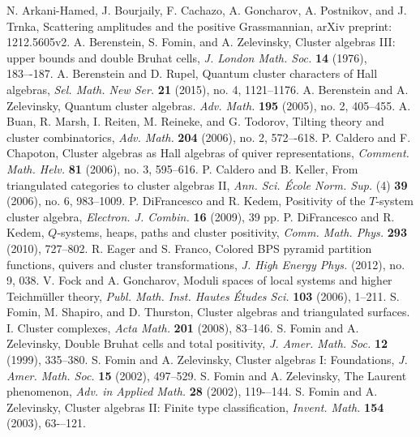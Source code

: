 \documentclass{amsart}
\theoremstyle{definition}
\theoremstyle{remark}
\numberwithin{equation}{section}
\begin{document}
\begin{thebibliography}{99}
  	 N. Arkani-Hamed, J. Bourjaily, F. Cachazo, A. Goncharov, A. Postnikov, and J. Trnka, Scattering amplitudes and the positive Grassmannian, arXiv preprint: 1212.5605v2.
  	 A. Berenstein, S. Fomin, and A. Zelevinsky, Cluster algebras III: upper bounds and double Bruhat cells, \textsl{J. London Math. Soc.} \textbf{14} (1976), 183–-187.
  	 A. Berenstein and D. Rupel, Quantum cluster characters of Hall algebras, \textsl{Sel. Math. New Ser.} \textbf{21} (2015), no. 4, 1121--1176.
  	 A. Berenstein and A. Zelevinsky, Quantum cluster algebras. \textsl{Adv. Math.} \textbf{195} (2005), no. 2, 405--455.
	 A. Buan, R. Marsh, I. Reiten, M. Reineke, and G. Todorov, Tilting theory and cluster combinatorics, \textsl{Adv. Math.} \textbf{204} (2006), no. 2, 572–-618.
  	 P. Caldero and F. Chapoton, Cluster algebras as Hall algebras of quiver representations, \textsl{Comment. Math. Helv.} \textbf{81} (2006), no. 3, 595--616.
  	 P. Caldero and B. Keller, From triangulated categories to cluster algebras II, \textsl{Ann. Sci. \'Ecole Norm. Sup.} (4) \textbf{39} (2006), no. 6, 983--1009.
	 P. DiFrancesco and R. Kedem, Positivity of the $T$-system cluster algebra, \textsl{Electron. J. Combin.} \textbf{16} (2009), 39 pp.
	 P. DiFrancesco and R. Kedem, $Q$-systems, heaps, paths and cluster positivity, \textsl{Comm. Math. Phys.} \textbf{293} (2010), 727--802.
  	 R. Eager and S. Franco, Colored BPS pyramid partition functions, quivers and cluster transformations, \textsl{J. High Energy Phys.} (2012), no. 9, 038.
	 V. Fock and A. Goncharov, Moduli spaces of local systems and higher Teichm\"uller theory, \textsl{Publ. Math. Inst. Hautes \'Etudes Sci.} \textbf{103} (2006), 1--211.
	 S. Fomin, M. Shapiro, and D. Thurston, Cluster algebras and triangulated surfaces. I. Cluster complexes, \textsl{Acta Math.} \textbf{201} (2008), 83--146.
	 S. Fomin and A. Zelevinsky, Double Bruhat cells and total positivity, \textsl{J. Amer. Math. Soc.} \textbf{12} (1999), 335--380.
	 S. Fomin and A. Zelevinsky, Cluster algebras I: Foundations, \textsl{J. Amer. Math. Soc.} \textbf{15} (2002), 497--529.
	 S. Fomin and A. Zelevinsky, The Laurent phenomenon, \textsl{Adv. in Applied Math.} \textbf{28} (2002), 119-–144.
  	 S. Fomin and A. Zelevinsky, Cluster algebras II: Finite type classification, \textsl{Invent. Math.} \textbf{154} (2003), 63-–121.

\end{thebibliography}
\end{document}
